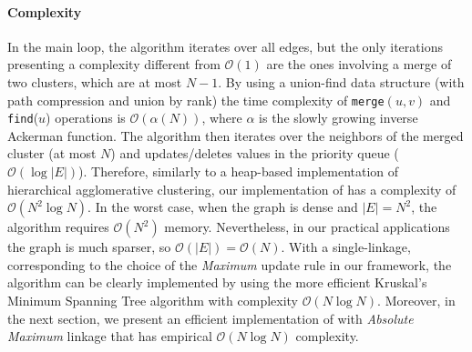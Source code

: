 \paragraph*{Complexity} In the main loop, the algorithm iterates over all edges, but the only iterations presenting a complexity different from $\mathcal{O}(1)$ are the ones involving a merge of two clusters, which are at most $N-1$. By using a union-find data structure (with path compression and union by rank) the time complexity of \texttt{merge}$(u, v)$ and \texttt{find}($u$) operations is $\mathcal{O}(\alpha(N))$, where $\alpha$ is the slowly growing inverse Ackerman function. The algorithm then iterates over the neighbors of the merged cluster (at most $N$) and updates/deletes values in the priority queue ($\mathcal{O}(\log |E|)$). Therefore, similarly to a heap-based implementation of hierarchical agglomerative clustering, our implementation of \algname{} has a complexity of $\mathcal{O}(N^2 \log N)$. In the worst case, when the graph is dense and $|E|=N^2$, the algorithm requires $\mathcal{O}(N^2)$ memory. Nevertheless, in our practical applications the graph is much sparser, so $\mathcal{O}(|E|)=\mathcal{O}(N)$. 
With a single-linkage, corresponding to the choice of the \emph{Maximum} update rule in our framework, the algorithm can be clearly implemented by using the more efficient Kruskal's Minimum Spanning Tree algorithm with complexity $\mathcal{O}(N \log N)$. 
Moreover, in the next section, we present an efficient implementation of \algname{} with \emph{Absolute Maximum} linkage that has empirical $\mathcal{O}(N \log N)$ complexity. %


